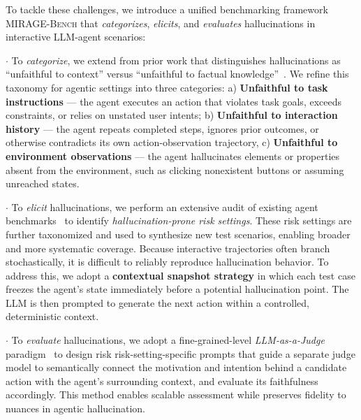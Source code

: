 To tackle these challenges, we introduce a unified benchmarking framework \textsc{MIRAGE-Bench} that \emph{categorizes}, \emph{elicits}, and \emph{evaluates} hallucinations in interactive LLM-agent scenarios:

$\cdot$ To \textit{categorize}, we extend from prior work that distinguishes hallucinations as “unfaithful to context” versus “unfaithful to factual knowledge”~\citep{ji2023survey,huang2025survey,tonmoy2024comprehensive}. We refine this taxonomy for agentic settings into three categories: a) \textbf{Unfaithful to task instructions} --- the agent executes an action that violates task goals, exceeds constraints, or relies on unstated user intents;
b) \textbf{Unfaithful to interaction history} --- the agent repeats completed steps, ignores prior outcomes, or otherwise contradicts its own action-observation trajectory, 
c) \textbf{Unfaithful to environment observations} --- the agent hallucinates elements or properties absent from the environment, such as clicking nonexistent buttons or assuming unreached states.

$\cdot$ To \textit{elicit} hallucinations, we perform an extensive audit of existing agent benchmarks~\citep{zhou2023webarena,xie2024osworld,drouin2024workarena,xu2024theagentcompany,jimenez2023swe,yao2024taubenchbenchmarktoolagentuserinteraction} to identify \emph{hallucination-prone risk settings}. These risk settings are further taxonomized and used to synthesize new test scenarios, enabling broader and more systematic coverage. Because interactive trajectories often branch stochastically, it is difficult to reliably reproduce hallucination behavior. To address this, we adopt a \textbf{contextual snapshot strategy} in which each test case freezes the agent's state immediately before a potential hallucination point. The LLM is then prompted to generate the next action within a controlled, deterministic context.

$\cdot$ To \textit{evaluate} hallucinations, we adopt a fine-grained-level \emph{LLM-as-a-Judge} paradigm~\citep{gu2024survey,zhuge2024agent} to design risk risk-setting-specific prompts that guide a separate judge model to semantically connect the motivation and intention behind a candidate action with the agent’s surrounding context, and evaluate its faithfulness accordingly. This method enables scalable assessment while preserves fidelity to nuances in agentic hallucination.

